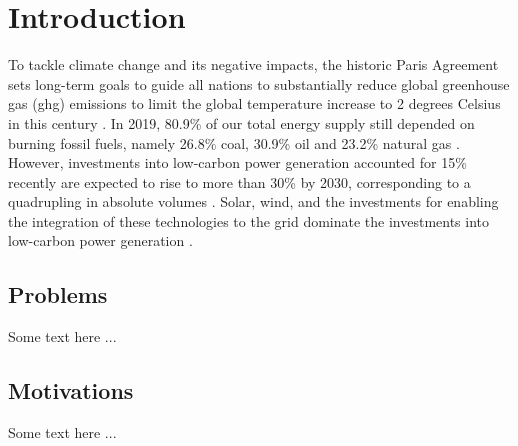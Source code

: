 \chapter{Introduction} 

To tackle climate change and its negative impacts, 
the historic Paris Agreement 
sets long-term goals to guide all nations 
to substantially reduce global greenhouse gas (\gls{ghg}) emissions 
to limit the global temperature increase
to 2 degrees Celsius in this century \cite{paris}. 
In 2019, 
80.9\% of our total energy supply still depended on burning fossil fuels, 
namely 
26.8\% coal, 30.9\% oil and 23.2\% natural gas \cite{iea}. 
However, 
investments into low-carbon power generation 
accounted for 15\% recently 
are expected to rise to more than 30\% by 2030, 
corresponding to a quadrupling in absolute volumes \cite{shift}. 
Solar, wind, and the investments 
for enabling the integration of these technologies to the grid 
dominate the investments into low-carbon power generation \cite{shift}. 


\section{Problems}

Some text here ...

\section{Motivations}

Some text here ...

